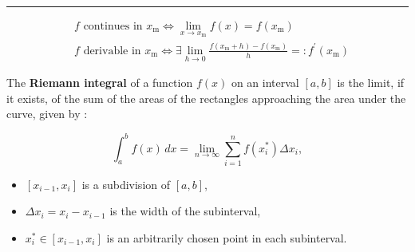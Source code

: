 \hrule
\begin{f} 

\[
\begin{aligned}
& f \text { continues in } x_\mathrm{m} \Leftrightarrow \lim _{x \rightarrow x_\mathrm{m}} f(x)=f\left(x_\mathrm{m}\right) \\
& f \text { derivable in } x_\mathrm{m} \Leftrightarrow \exists \lim _{h \rightarrow 0} \frac{f\left(x_\mathrm{m}+h\right)-f\left(x_\mathrm{m}\right)}{h}=: f^{\prime}\left(x_\mathrm{m}\right)
\end{aligned}
\]
 
The \textbf{Riemann integral} of a function \(f(x)\) on an interval \([a, b]\) is the limit, if it exists, of the sum of the areas of the rectangles approaching the area under the curve, given by :  

\[
\int_a^b f(x) \, dx = \lim_{n \to \infty} \sum_{i=1}^n f(x_i^*) \Delta x_i,
\]
\begin{itemize}
\item \( [x_{i-1}, x_i] \) is a subdivision of \([a, b]\),  
\item \( \Delta x_i = x_i - x_{i-1} \) is the width of the subinterval,  
\item \( x_i^* \in [x_{i-1}, x_i] \) is an arbitrarily chosen point in each subinterval.
\end{itemize}
  

\end{f}
